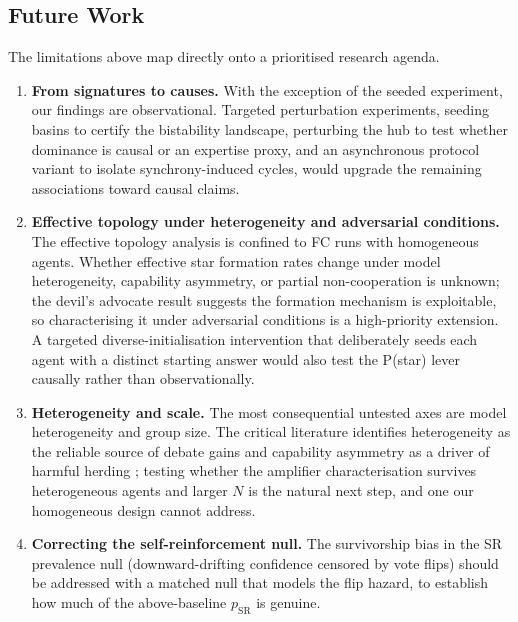 \subsection{Future Work}
\label{sec:conclusion:future}

The limitations above map directly onto a prioritised research agenda.

\begin{enumerate}
  \item \textbf{From signatures to causes.} With the exception of the seeded
        experiment, our findings are observational. Targeted perturbation
        experiments, seeding basins to certify the bistability landscape,
        perturbing the hub to test whether dominance is causal or an expertise
        proxy, and an asynchronous protocol variant to isolate synchrony-induced
        cycles, would upgrade the remaining associations toward causal claims.

  \item \textbf{Effective topology under heterogeneity and adversarial conditions.}
        The effective topology analysis is confined to FC runs with homogeneous
        agents. Whether effective star formation rates change under model
        heterogeneity, capability asymmetry, or partial non-cooperation is
        unknown; the devil's advocate result suggests the formation mechanism is
        exploitable, so characterising it under adversarial conditions is a
        high-priority extension. A targeted diverse-initialisation intervention
        that deliberately seeds each agent with a distinct starting answer would
        also test the P(star) lever causally rather than observationally.

  \item \textbf{Heterogeneity and scale.} The most consequential untested axes are
        model heterogeneity and group size. The critical literature identifies
        heterogeneity as the reliable source of debate gains
        \citep{liu2025stopovervaluing, chen2024reconcile} and capability asymmetry
        as a driver of harmful herding \citep{wynn2025talk}; testing whether the
        amplifier characterisation survives heterogeneous agents and larger $N$ is
        the natural next step, and one our homogeneous design cannot address.

  \item \textbf{Correcting the self-reinforcement null.} The survivorship bias in
        the SR prevalence null (downward-drifting confidence censored by vote
        flips) should be addressed with a matched null that models the flip hazard,
        to establish how much of the above-baseline $p_{\mathrm{SR}}$ is genuine.


\end{enumerate}
